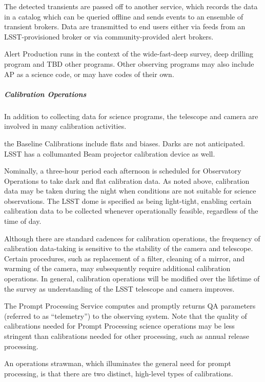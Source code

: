 The detected transients are passed off to another service, which
records the data in a catalog which can be queried offline and sends
events to an ensemble of transient brokers. Data are transmitted to end
users either via feeds from an LSST-provisioned broker or via
community-provided alert brokers.

Alert Production runs in the context of the wide-fast-deep survey,
deep drilling program and TBD other programs. Other observing programs
may also include AP as a science code, or may have codes of their own.

\subparagraph{Calibration Operations}

In addition to collecting data for science programs, the telescope and
camera are involved in many calibration activities.

the Baseline Calibrations include flats and biases. Darks are not anticipated.
LSST has a collumanted Beam projector calibration device as well.

Nominally, a three-hour period each afternoon is scheduled for Observatory
Operations to take dark and flat calibration data. As noted above, calibration data
may be taken during the night when conditions are not suitable for
science observations. The LSST dome is specified as being
light-tight, enabling certain calibration data to be collected
whenever operationally feasible, regardless of the time of day.

Although there are standard cadences for calibration operations, the
frequency of calibration data-taking is sensitive to the stability of
the camera and telescope. Certain procedures, such as replacement of a
filter, cleaning of a mirror, and warming of the camera, may
subsequently require additional calibration operations. In general,
calibration operations will be modified over the lifetime of the
survey as understanding of the LSST telescope and camera improves.

The Prompt Processing Service computes and promptly returns QA
parameters (referred to as “telemetry”) to the observing system. Note
that the quality of calibrations needed for Prompt Processing science
operations may be less stringent than calibrations needed for other
processing, such as annual release processing.

An operations strawman, which illuminates the general need for prompt
processing, is that there are two distinct, high-level types of
calibrations.

